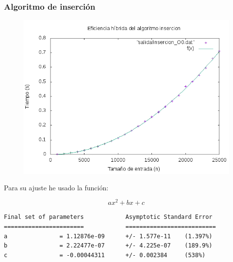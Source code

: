 \documentclass[spanish]{beamer}
\begin{document}
%
%

\begin{frame}\frametitle{Algoritmo de inserción}
  \begin{figure}[H]
    \centering   
        \includegraphics[clip,width=1\columnwidth]{../../plots/insercion_O0_fit.png}%
    \end{figure}
\end{frame}

\begin{frame}[fragile]
  Para su ajuste he usado la función:

  $$ax^2+bx+c$$
  
\scriptsize
\begin{verbatim}
Final set of parameters            Asymptotic Standard Error
=======================            ==========================
a               = 1.12876e-09      +/- 1.577e-11    (1.397%)
b               = 2.22477e-07      +/- 4.225e-07    (189.9%)
c               = -0.00044311      +/- 0.002384     (538%)
\end{verbatim}

\end{frame}


%
%
\end{document}
